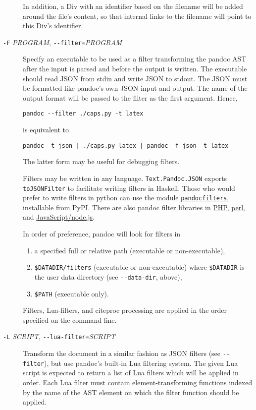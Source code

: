 \begin{description}
In addition, a Div with an identifier based on the filename will be
added around the file's content, so that internal links to the filename
will point to this Div's identifier.
\item[\texttt{-F} \emph{PROGRAM}, \texttt{-\/-filter=}\emph{PROGRAM}]
Specify an executable to be used as a filter transforming the pandoc AST
after the input is parsed and before the output is written. The
executable should read JSON from stdin and write JSON to stdout. The
JSON must be formatted like pandoc's own JSON input and output. The name
of the output format will be passed to the filter as the first argument.
Hence,

\begin{verbatim}
pandoc --filter ./caps.py -t latex
\end{verbatim}

is equivalent to

\begin{verbatim}
pandoc -t json | ./caps.py latex | pandoc -f json -t latex
\end{verbatim}

The latter form may be useful for debugging filters.

Filters may be written in any language. \texttt{Text.Pandoc.JSON}
exports \texttt{toJSONFilter} to facilitate writing filters in Haskell.
Those who would prefer to write filters in python can use the module
\href{https://github.com/jgm/pandocfilters}{\texttt{pandocfilters}},
installable from PyPI. There are also pandoc filter libraries in
\href{https://github.com/vinai/pandocfilters-php}{PHP},
\href{https://metacpan.org/pod/Pandoc::Filter}{perl}, and
\href{https://github.com/mvhenderson/pandoc-filter-node}{JavaScript/node.js}.

In order of preference, pandoc will look for filters in

\begin{enumerate}
\def\labelenumi{\arabic{enumi}.}
\item
  a specified full or relative path (executable or non-executable),
\item
  \texttt{\$DATADIR/filters} (executable or non-executable) where
  \texttt{\$DATADIR} is the user data directory (see
  \texttt{-\/-data-dir}, above),
\item
  \texttt{\$PATH} (executable only).
\end{enumerate}

Filters, Lua-filters, and citeproc processing are applied in the order
specified on the command line.
\item[\texttt{-L} \emph{SCRIPT}, \texttt{-\/-lua-filter=}\emph{SCRIPT}]
Transform the document in a similar fashion as JSON filters (see
\texttt{-\/-filter}), but use pandoc's built-in Lua filtering system.
The given Lua script is expected to return a list of Lua filters which
will be applied in order. Each Lua filter must contain
element-transforming functions indexed by the name of the AST element on
which the filter function should be applied.


\end{description}
